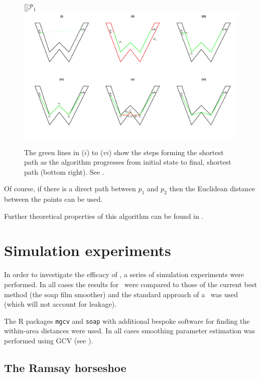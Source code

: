 \begin{figure}
\centering
[]{$\mathcal{P}_1$}
\includegraphics[trim=0in 0.5in 0in 0.25in, width=9.5in]{mds/figs/wdia.pdf} \\
\caption{The green lines in ($i$) to ($vi$) show the steps forming the shortest path as the algorithm progresses from initial state to final, shortest path (bottom right). See .}
\label{wdia}
\end{figure}

Of course, if there is a direct path between $p_1$ and $p_2$ then the Euclidean distance between the points can be used.

Further theoretical properties of this algorithm can be found in .

\section{Simulation experiments}
\label{mdssims}

In order to investigate the efficacy of \mdsap, a series of simulation experiments were performed. In all cases the results for \mdsap\ were compared to those of the current best method (the soap film smoother) and the standard approach of a \tprs\ was used (which will not account for leakage).

The \textsf{R} packages \texttt{mgcv} and \texttt{soap} with additional bespoke software for finding the within-area distances were used. In all cases smoothing parameter estimation was performed using GCV (see ).

\subsection{The Ramsay horseshoe}

